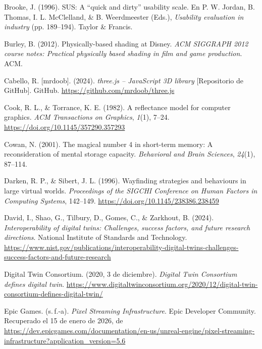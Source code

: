 \begin{list}{}
\item Brooke, J. (1996). SUS: A ``quick and dirty'' usability scale. En P. W. Jordan, B. Thomas, I. L. McClelland, \& B. Weerdmeester (Eds.), \textit{Usability evaluation in industry} (pp. 189--194). Taylor \& Francis.

\item Burley, B. (2012). Physically-based shading at Disney. \textit{ACM SIGGRAPH 2012 course notes: Practical physically based shading in film and game production}. ACM.

\item Cabello, R. [mrdoob]. (2024). \textit{three.js -- JavaScript 3D library} [Repositorio de GitHub]. GitHub. \url{https://github.com/mrdoob/three.js}

\item Cook, R. L., \& Torrance, K. E. (1982). A reflectance model for computer graphics. \textit{ACM Transactions on Graphics}, \textit{1}(1), 7--24. \url{https://doi.org/10.1145/357290.357293}

\item Cowan, N. (2001). The magical number 4 in short-term memory: A reconsideration of mental storage capacity. \textit{Behavioral and Brain Sciences}, \textit{24}(1), 87--114.

\item Darken, R. P., \& Sibert, J. L. (1996). Wayfinding strategies and behaviours in large virtual worlds. \textit{Proceedings of the SIGCHI Conference on Human Factors in Computing Systems}, 142--149. \url{https://doi.org/10.1145/238386.238459}

\item David, I., Shao, G., Tilbury, D., Gomes, C., \& Zarkhout, B. (2024). \textit{Interoperability of digital twins: Challenges, success factors, and future research directions}. National Institute of Standards and Technology. \url{https://www.nist.gov/publications/interoperability-digital-twins-challenges-success-factors-and-future-research}

\item Digital Twin Consortium. (2020, 3 de diciembre). \textit{Digital Twin Consortium defines digital twin}. \url{https://www.digitaltwinconsortium.org/2020/12/digital-twin-consortium-defines-digital-twin/}

\item Epic Games. (s.\,f.-a). \textit{Pixel Streaming Infrastructure}. Epic Developer Community. Recuperado el 15 de enero de 2026, de \url{https://dev.epicgames.com/documentation/en-us/unreal-engine/pixel-streaming-infrastructure?application_version=5.6}


\end{list}
